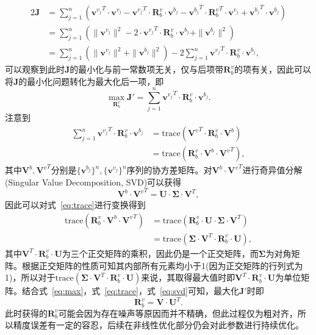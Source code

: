 \begin{align}
  2\symbf{J} &= \sum_{j=1}^{n} ({\symbf{v}^{v_{j}}}^T \cdot \symbf{v}^{v_{j}} - {\symbf{v}^{v_{j}}}^T \cdot \symbf{R}_{b}^{v} \cdot \symbf{v}^{b_{j}} - {\symbf{v}^{b_{j}}}^T \cdot {\symbf{R}_{b}^{v}}^T \cdot {\symbf{v}^{v_{j}}} + {\symbf{v}^{b_{j}}}^T \cdot \symbf{v}^{b_{j}}) \\ 
  &= \sum_{j=1}^{n} (\| \symbf{v}^{v_{j}} \|^2 - 2\cdot {\symbf{v}^{v_{j}}}^T \cdot \symbf{R}_{b}^{v} \cdot \symbf{v}^{b_{j}} + \| \symbf{v}^{b_{j}} \|^2) \\
  &= \sum_{j=1}^{n} (\| \symbf{v}^{v_{j}} \|^2 + \| \symbf{v}^{b_{j}} \|^2) - 2 \sum_{j=1}^{n} {\symbf{v}^{v_{j}}}^T \cdot \symbf{R}_{b}^{v} \cdot \symbf{v}^{b_{j}},
\end{align}
可以观察到此时$\symbf{J}$的最小化与前一常数项无关，仅与后项带$\symbf{R}_b^v$的项有关，因此可以将$\symbf{J}$的最小化问题转化为最大化后一项，即
\begin{equation}
  \max_{\symbf{R}_{b}^{v}} \symbf{J}' = \sum_{j=1}^{n} {\symbf{v}^{v_{j}}}^T \cdot \symbf{R}_{b}^{v} \cdot \symbf{v}^{b_{j}}.
\label{eq:max}
\end{equation}
注意到
\begin{align}
  \sum_{j=1}^{n} {\symbf{v}^{v_{j}}}^T \cdot \symbf{R}_{b}^{v} \cdot \symbf{v}^{b_{j}} &= \text{trace}({\symbf{V}^{v}}^T \cdot \symbf{R}_{b}^{v} \cdot \symbf{V}^{b}) \\ 
  &= \text{trace}( \symbf{R}_{b}^{v} \cdot \symbf{V}^{b} \cdot {\symbf{V}^{v}}^T), \label{eq:trace}
\end{align}
其中$\symbf{V}^{b}, {\symbf{V}^{v}}^T$分别是$\{\symbf{v}^{b_{j}}\}^n,\{\symbf{v}^{v_{j}}\}^n$序列的协方差矩阵。对$\symbf{V}^{b} \cdot {\symbf{V}^{v}}^T$进行奇异值分解(Singular Value Decomposition, SVD)可以获得
\begin{equation}
  \symbf{V}^{b} \cdot {\symbf{V}^{v}}^T = \symbf{U} \cdot \symbf{\Sigma} \cdot \symbf{V}^T,
\label{eq:svd}
\end{equation}
因此可以对式~\eqref{eq:trace}进行变换得到
\begin{align}
  \text{trace}( \symbf{R}_{b}^{v} \cdot \symbf{V}^{b} \cdot {\symbf{V}^{v}}^T) &= \text{trace}(\symbf{R}_{b}^{v} \cdot \symbf{U} \cdot \symbf{\Sigma} \cdot \symbf{V}^T) \\
  &= \text{trace}(\symbf{\Sigma} \cdot \symbf{V}^T \cdot \symbf{R}_{b}^{v} \cdot \symbf{U}),
\end{align}
其中$\symbf{V}^T \cdot \symbf{R}_{b}^{v} \cdot \symbf{U}$为三个正交矩阵的乘积，因此仍是一个正交矩阵，而$\symbf{\Sigma}$为对角矩阵。根据正交矩阵的性质可知其内部所有元素均小于1(因为正交矩阵的行列式为1)，所以对于$\text{trace}(\symbf{\Sigma} \cdot \symbf{V}^T \cdot \symbf{R}_{b}^{v} \cdot \symbf{U})$来说，其取得最大值时即$\symbf{V}^T \cdot \symbf{R}_{b}^{v} \cdot \symbf{U}$为单位矩阵。结合式~\eqref{eq:max}，式~\eqref{eq:trace}，式~\eqref{eq:svd}可知，最大化$\symbf{J}'$时即
\begin{equation}
  \symbf{R}_{b}^{v} = \symbf{V} \cdot \symbf{U}^T.
\end{equation}
此时获得的$\symbf{R}_{b}^{v}$可能会因为存在噪声等原因而并不精确，但此过程仅为粗对齐，所以精度误差有一定的容忍，后续在非线性优化部分仍会对此参数进行持续优化。

